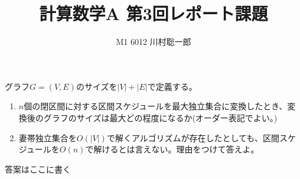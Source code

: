 \documentclass[dvipdfmx]{jsreport}
\title{計算数学A 第3回レポート課題}
\author{M1 6012 川村聡一郎}
\date{}
\begin{document}
\maketitle
	グラフ$G= (V, E)$のサイズを$|V|+ |E|$で定義する。
\begin{tcolorbox}
\begin{enumerate}
	\item $n$個の閉区間に対する区間スケジュールを最大独立集合に変換したとき、変換後のグラフのサイズは最大どの程度になるか(オーダー表記でよい。)
	\item 妻帯独立集合を$O(|V|)$で解くアルゴリズムが存在したとしても、区間スケジュールを$O(n)$で解けるとは言えない。理由をつけて答えよ。
\end{enumerate}
\end{tcolorbox}

\begin{souanswer} %
	答案はここに書く
\end{souanswer}
\end{document}
